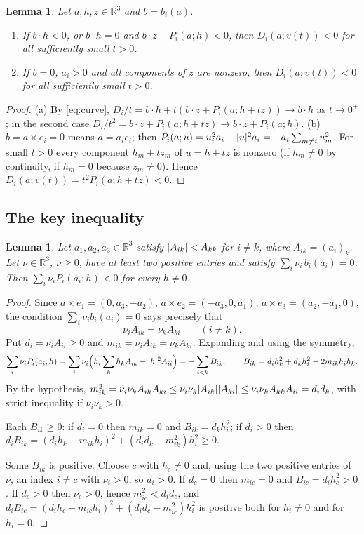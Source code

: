 \documentclass[11pt]{article}
\newtheorem{lemma}[theorem]{Lemma}
\theoremstyle{definition}
\theoremstyle{remark}
\newcommand{\R}{\mathbb{R}}
\DeclarePairedDelimiter{\abs}{\lvert}{\rvert}
\begin{document}
\begin{lemma}\label{lem:order}
Let $a,h,z\in\R^3$ and $b=b_i(a)$.
\begin{enumerate}
\item[(a)] If $b\cdot h<0$, or $b\cdot h=0$ and $b\cdot z+P_i(a;h)<0$, then $D_i(a;v(t))<0$ for all
sufficiently small $t>0$.
\item[(b)] If $b=0$, $a_i>0$ and all components of $z$ are nonzero, then $D_i(a;v(t))<0$ for all
sufficiently small $t>0$.
\end{enumerate}
\end{lemma}
\begin{proof}
(a) By \eqref{eq:curve}, $D_i/t=b\cdot h+t(b\cdot z+P_i(a;h+tz))\to b\cdot h$ as $t\to0^+$; in the
second case $D_i/t^2=b\cdot z+P_i(a;h+tz)\to b\cdot z+P_i(a;h)$.
(b) $b=a\times e_i=0$ means $a=a_ie_i$; then $P_i(a;u)=u_i^2a_i-\abs{u}^2a_i=-a_i\sum_{m\ne i}u_m^2$.
For small $t>0$ every component $h_m+tz_m$ of $u=h+tz$ is nonzero (if $h_m\ne0$ by continuity, if
$h_m=0$ because $z_m\ne0$). Hence $D_i(a;v(t))=t^2P_i(a;h+tz)<0$.
\end{proof}

\subsection{The key inequality}

\begin{lemma}\label{lem:key}
Let $a_1,a_2,a_3\in\R^3$ satisfy $\abs{A_{ik}}<A_{kk}$ for $i\ne k$, where $A_{ik}=(a_i)_k$. Let
$\nu\in\R^3$, $\nu\ge0$, have at least two positive entries and satisfy
$\sum_i\nu_i\,b_i(a_i)=0$. Then $\sum_i\nu_iP_i(a_i;h)<0$ for every $h\ne0$.
\end{lemma}

\begin{proof}
Since $a\times e_1=(0,a_3,-a_2)$, $a\times e_2=(-a_3,0,a_1)$, $a\times e_3=(a_2,-a_1,0)$, the condition
$\sum_i\nu_ib_i(a_i)=0$ says precisely that
\[
\nu_iA_{ik}=\nu_kA_{ki}\qquad(i\ne k).
\]
Put $d_i=\nu_iA_{ii}\ge0$ and $m_{ik}=\nu_iA_{ik}=\nu_kA_{ki}$. Expanding and using the symmetry,
\[
\sum_i\nu_iP_i(a_i;h)=\sum_i\nu_i\Bigl(h_i\sum_kh_kA_{ik}-\abs{h}^2A_{ii}\Bigr)=-\sum_{i<k}B_{ik},
\qquad B_{ik}=d_ih_k^2+d_kh_i^2-2m_{ik}h_ih_k .
\]
By the hypothesis,
$m_{ik}^2=\nu_i\nu_kA_{ik}A_{ki}\le\nu_i\nu_k\abs{A_{ik}}\abs{A_{ki}}\le\nu_i\nu_kA_{kk}A_{ii}=d_id_k$,
with strict inequality if $\nu_i\nu_k>0$.

Each $B_{ik}\ge0$: if $d_i=0$ then $m_{ik}=0$ and $B_{ik}=d_kh_i^2$; if $d_i>0$ then
$d_iB_{ik}=(d_ih_k-m_{ik}h_i)^2+(d_id_k-m_{ik}^2)h_i^2\ge0$.

Some $B_{ik}$ is positive. Choose $c$ with $h_c\ne0$ and, using the two positive entries of $\nu$, an
index $i\ne c$ with $\nu_i>0$, so $d_i>0$. If $d_c=0$ then $m_{ic}=0$ and $B_{ic}=d_ih_c^2>0$. If
$d_c>0$ then $\nu_c>0$, hence $m_{ic}^2<d_id_c$, and $d_iB_{ic}=(d_ih_c-m_{ic}h_i)^2+(d_id_c-m_{ic}^2)h_i^2$
is positive both for $h_i\ne0$ and for $h_i=0$.
\end{proof}
\end{document}
